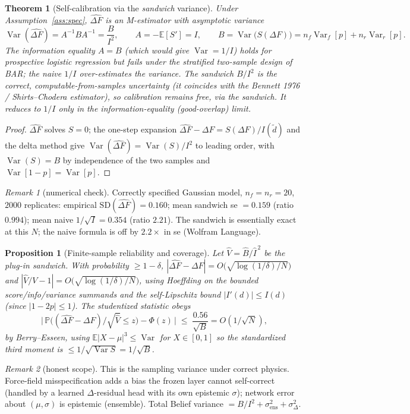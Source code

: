 \documentclass[11pt]{article}
\theoremstyle{plain}
\newtheorem{theorem}{Theorem}
\newtheorem{proposition}{Proposition}
\theoremstyle{remark}
\newtheorem{remark}{Remark}
\DeclareMathOperator{\Var}{Var}
\newcommand{\dFh}{\widehat{\Delta F}}
\newcommand{\dF}{\Delta F}
\begin{document}
\begin{theorem}[Self-calibration via the \emph{sandwich} variance]\label{thm:calib}
Under Assumption~\ref{ass:spec}, $\dFh$ is an M-estimator with asymptotic variance
\[
\Var(\dFh)=A^{-1}BA^{-1}=\frac{B}{I^2},\qquad
A=-\mathbb E[S']=I,\qquad
B=\Var\!\big(S(\dF)\big)=n_f\Var_f[p]+n_r\Var_r[p].
\]
The information equality $A=B$ (which would give $\Var=1/I$) holds for prospective logistic regression but \emph{fails} under the stratified two-sample design of BAR; the naive $1/I$ over-estimates the variance. The sandwich $B/I^2$ is the correct, computable-from-samples uncertainty (it coincides with the Bennett 1976 / Shirts--Chodera estimator), so calibration remains free, via the sandwich. It reduces to $1/I$ only in the information-equality (good-overlap) limit.
\end{theorem}
\begin{proof}
$\dFh$ solves $S=0$; the one-step expansion $\dFh-\dF=S(\dF)/I(\tilde d)$ and the delta method give $\Var(\dFh)=\Var(S)/I^2$ to leading order, with $\Var(S)=B$ by independence of the two samples and $\Var[1-p]=\Var[p]$.
\end{proof}
\begin{remark}[numerical check]
Correctly specified Gaussian model, $n_f=n_r=20$, $2000$ replicates: empirical $\mathrm{SD}(\dFh)=0.160$; mean sandwich se $=0.159$ (ratio $0.994$); mean naive $1/\sqrt I=0.354$ (ratio $2.21$). The sandwich is essentially exact at this $N$; the naive formula is off by $2.2\times$ in se (Wolfram Language).
\end{remark}

\begin{proposition}[Finite-sample reliability and coverage]\label{prop:finite}
Let $\widehat V=\widehat B/\widehat I^{\,2}$ be the plug-in sandwich. With probability $\ge1-\delta$,
$|\dFh-\dF|=O\!\big(\sqrt{\log(1/\delta)/N}\big)$ and $|\widehat V/V-1|=O\!\big(\sqrt{\log(1/\delta)/N}\big)$,
using Hoeffding on the bounded score/info/variance summands and the self-Lipschitz bound $|I'(d)|\le I(d)$ (since $|1-2p|\le1$). The studentized statistic obeys
\[
\Big|\,\mathbb P\big((\dFh-\dF)/\sqrt{\widehat V}\le z\big)-\Phi(z)\,\Big|\;\le\;\frac{0.56}{\sqrt B}=O(1/\sqrt N),
\]
by Berry--Esseen, using $\mathbb E|X-\mu|^3\le\Var$ for $X\in[0,1]$ so the standardized third moment is $\le 1/\sqrt{\Var S}=1/\sqrt B$.
\end{proposition}
\begin{remark}[honest scope]
This is the sampling variance under correct physics. Force-field misspecification adds a bias the frozen layer cannot self-correct (handled by a learned $\Delta$-residual head with its own epistemic $\sigma$); network error about $(\mu,\sigma)$ is epistemic (ensemble). Total Belief variance $=B/I^2+\sigma^2_{\mathrm{ens}}+\sigma^2_\Delta$.
\end{remark}
\end{document}
